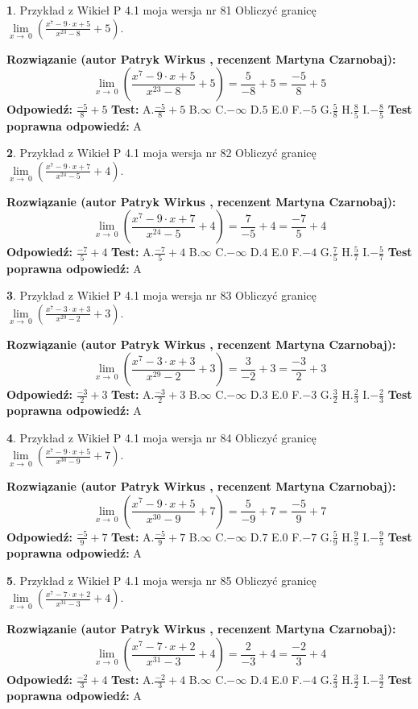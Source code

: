 \documentclass[12pt, a4paper]{article}
\theoremstyle{definition} %
\newtheorem{zad}{}
\newcommand{\zadStart}[1]{\begin{zad}#1\newline}
\newcommand{\zadStop}{\end{zad}}
\newcommand{\rozwStart}[2]{\noindent \textbf{Rozwiązanie (autor #1 , recenzent #2): }\newline}
\newcommand{\rozwStop}{\newline}
\newcommand{\odpStart}{\noindent \textbf{Odpowiedź:}\newline}
\newcommand{\odpStop}{\newline}
\newcommand{\testStart}{\noindent \textbf{Test:}\newline}
\newcommand{\testStop}{\newline}
\newcommand{\kluczStart}{\noindent \textbf{Test poprawna odpowiedź:}\newline}
\newcommand{\kluczStop}{\newline}
\begin{document}
\zadStart{Przykład z Wikieł P 4.1 moja wersja nr 81}
Obliczyć granicę $\lim\limits_{x\to\ 0}(\frac{x^{7}-9 \cdot x +5}{x^{23}-8}+5)$.
\zadStop
\rozwStart{Patryk Wirkus}{Martyna Czarnobaj}
$$\lim\limits_{x\to\ 0}(\frac{x^{7}-9 \cdot x +5}{x^{23}-8}+5)=\frac{5}{-8}+5=\frac{-5}{8}+5$$
\rozwStop
\odpStart
$\frac{-5}{8}+5$
\odpStop
\testStart
A.$\frac{-5}{8}+5$
B.$\infty$
C.$-\infty$
D.$5$
E.$0$
F.$-5$
G.$\frac{5}{8}$
H.$\frac{8}{5}$
I.$-\frac{8}{5}$
\testStop
\kluczStart
A
\kluczStop



\zadStart{Przykład z Wikieł P 4.1 moja wersja nr 82}
Obliczyć granicę $\lim\limits_{x\to\ 0}(\frac{x^{7}-9 \cdot x +7}{x^{24}-5}+4)$.
\zadStop
\rozwStart{Patryk Wirkus}{Martyna Czarnobaj}
$$\lim\limits_{x\to\ 0}(\frac{x^{7}-9 \cdot x +7}{x^{24}-5}+4)=\frac{7}{-5}+4=\frac{-7}{5}+4$$
\rozwStop
\odpStart
$\frac{-7}{5}+4$
\odpStop
\testStart
A.$\frac{-7}{5}+4$
B.$\infty$
C.$-\infty$
D.$4$
E.$0$
F.$-4$
G.$\frac{7}{5}$
H.$\frac{5}{7}$
I.$-\frac{5}{7}$
\testStop
\kluczStart
A
\kluczStop



\zadStart{Przykład z Wikieł P 4.1 moja wersja nr 83}
Obliczyć granicę $\lim\limits_{x\to\ 0}(\frac{x^{7}-3 \cdot x +3}{x^{29}-2}+3)$.
\zadStop
\rozwStart{Patryk Wirkus}{Martyna Czarnobaj}
$$\lim\limits_{x\to\ 0}(\frac{x^{7}-3 \cdot x +3}{x^{29}-2}+3)=\frac{3}{-2}+3=\frac{-3}{2}+3$$
\rozwStop
\odpStart
$\frac{-3}{2}+3$
\odpStop
\testStart
A.$\frac{-3}{2}+3$
B.$\infty$
C.$-\infty$
D.$3$
E.$0$
F.$-3$
G.$\frac{3}{2}$
H.$\frac{2}{3}$
I.$-\frac{2}{3}$
\testStop
\kluczStart
A
\kluczStop



\zadStart{Przykład z Wikieł P 4.1 moja wersja nr 84}
Obliczyć granicę $\lim\limits_{x\to\ 0}(\frac{x^{7}-9 \cdot x +5}{x^{30}-9}+7)$.
\zadStop
\rozwStart{Patryk Wirkus}{Martyna Czarnobaj}
$$\lim\limits_{x\to\ 0}(\frac{x^{7}-9 \cdot x +5}{x^{30}-9}+7)=\frac{5}{-9}+7=\frac{-5}{9}+7$$
\rozwStop
\odpStart
$\frac{-5}{9}+7$
\odpStop
\testStart
A.$\frac{-5}{9}+7$
B.$\infty$
C.$-\infty$
D.$7$
E.$0$
F.$-7$
G.$\frac{5}{9}$
H.$\frac{9}{5}$
I.$-\frac{9}{5}$
\testStop
\kluczStart
A
\kluczStop



\zadStart{Przykład z Wikieł P 4.1 moja wersja nr 85}
Obliczyć granicę $\lim\limits_{x\to\ 0}(\frac{x^{7}-7 \cdot x +2}{x^{31}-3}+4)$.
\zadStop
\rozwStart{Patryk Wirkus}{Martyna Czarnobaj}
$$\lim\limits_{x\to\ 0}(\frac{x^{7}-7 \cdot x +2}{x^{31}-3}+4)=\frac{2}{-3}+4=\frac{-2}{3}+4$$
\rozwStop
\odpStart
$\frac{-2}{3}+4$
\odpStop
\testStart
A.$\frac{-2}{3}+4$
B.$\infty$
C.$-\infty$
D.$4$
E.$0$
F.$-4$
G.$\frac{2}{3}$
H.$\frac{3}{2}$
I.$-\frac{3}{2}$
\testStop
\kluczStart
A
\kluczStop
\end{document}
